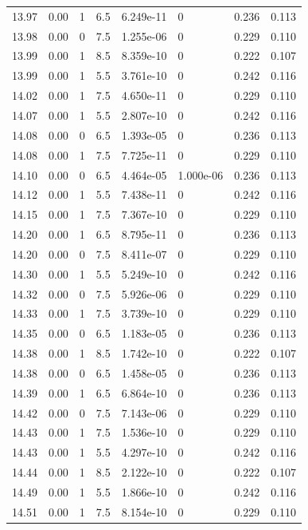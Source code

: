 \documentclass[preview]{standalone}
\begin{document}
{{{{{{{{{{{{\begin{tabular}{L{1.2cm}C{1.2cm} C{0.3cm}C{0.5cm} C{1.4cm}C{1.4cm} C{1.4cm}C{1.4cm}}
  13.97  &  0.00  & 1     & 6.5 &  6.249e-11  & 0  & 0.236 &  0.113   \\ 
  13.98  &  0.00  & 0     & 7.5 &  1.255e-06  & 0  & 0.229 &  0.110   \\ 
  13.99  &  0.00  & 1     & 8.5 &  8.359e-10  & 0  & 0.222 &  0.107   \\ 
  13.99  &  0.00  & 1     & 5.5 &  3.761e-10  & 0  & 0.242 &  0.116   \\ 
  14.02  &  0.00  & 1     & 7.5 &  4.650e-11  & 0  & 0.229 &  0.110   \\ 
  14.07  &  0.00  & 1     & 5.5 &  2.807e-10  & 0  & 0.242 &  0.116   \\ 
  14.08  &  0.00  & 0     & 6.5 &  1.393e-05  & 0  & 0.236 &  0.113   \\ 
  14.08  &  0.00  & 1     & 7.5 &  7.725e-11  & 0  & 0.229 &  0.110   \\ 
  14.10  &  0.00  & 0     & 6.5 &  4.464e-05  & 1.000e-06  & 0.236 &  0.113   \\ 
  14.12  &  0.00  & 1     & 5.5 &  7.438e-11  & 0  & 0.242 &  0.116   \\ 
  14.15  &  0.00  & 1     & 7.5 &  7.367e-10  & 0  & 0.229 &  0.110   \\ 
  14.20  &  0.00  & 1     & 6.5 &  8.795e-11  & 0  & 0.236 &  0.113   \\ 
  14.20  &  0.00  & 0     & 7.5 &  8.411e-07  & 0  & 0.229 &  0.110   \\ 
  14.30  &  0.00  & 1     & 5.5 &  5.249e-10  & 0  & 0.242 &  0.116   \\ 
  14.32  &  0.00  & 0     & 7.5 &  5.926e-06  & 0  & 0.229 &  0.110   \\ 
  14.33  &  0.00  & 1     & 7.5 &  3.739e-10  & 0  & 0.229 &  0.110   \\ 
  14.35  &  0.00  & 0     & 6.5 &  1.183e-05  & 0  & 0.236 &  0.113   \\ 
  14.38  &  0.00  & 1     & 8.5 &  1.742e-10  & 0  & 0.222 &  0.107   \\ 
  14.38  &  0.00  & 0     & 6.5 &  1.458e-05  & 0  & 0.236 &  0.113   \\ 
  14.39  &  0.00  & 1     & 6.5 &  6.864e-10  & 0  & 0.236 &  0.113   \\ 
  14.42  &  0.00  & 0     & 7.5 &  7.143e-06  & 0  & 0.229 &  0.110   \\ 
  14.43  &  0.00  & 1     & 7.5 &  1.536e-10  & 0  & 0.229 &  0.110   \\ 
  14.43  &  0.00  & 1     & 5.5 &  4.297e-10  & 0  & 0.242 &  0.116   \\ 
  14.44  &  0.00  & 1     & 8.5 &  2.122e-10  & 0  & 0.222 &  0.107   \\ 
  14.49  &  0.00  & 1     & 5.5 &  1.866e-10  & 0  & 0.242 &  0.116   \\ 
  14.51  &  0.00  & 1     & 7.5 &  8.154e-10  & 0  & 0.229 &  0.110   \\ 
\hline 
\end{tabular} 

}}}}}}}}}}}}
\end{document}
